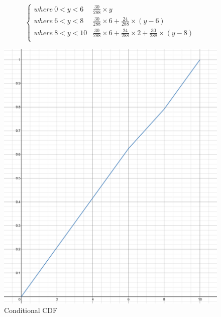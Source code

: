 \documentclass[12pt,twoside]{article}
\begin{document}
\begin{enumerate}
$$\begin{cases}
     where \ 0 < y < 6 & \frac{30}{288} \times y\\
     where \ 6 < y < 8 & \frac{30}{288} \times 6 + \frac{24}{288} \times (y-6)\\
     where \ 8 < y < 10 & \frac{30}{288} \times 6 + \frac{24}{288} \times 2 + \frac{30}{288} \times (y-8)\\
    \end{cases}
$$
\begin{figure}[h!]
    \centering
    \includegraphics[scale=.4]{desmos 1002 hw5 1.c.png}
    \caption{Conditional CDF}
    \label{fig:my_label}
\end{figure}

\newpage 


\end{enumerate}
\end{document}
